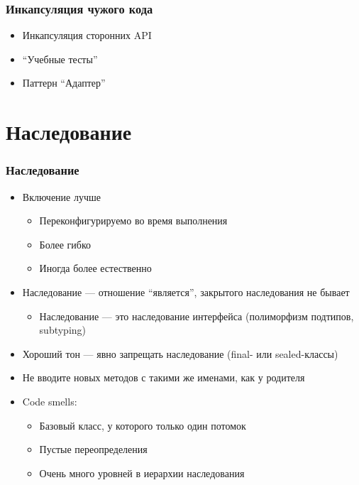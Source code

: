 \documentclass[xetex,mathserif,serif]{beamer}
\begin{document}
	\begin{frame}
		\frametitle{Инкапсуляция чужого кода}
		\begin{itemize}
			\item Инкапсуляция сторонних API
			\item ``Учебные тесты''
			\item Паттерн ``Адаптер''
		\end{itemize}
	\end{frame}

	\section{Наследование}

	\begin{frame}
		\frametitle{Наследование}
		\begin{itemize}
			\item Включение лучше
			\begin{itemize}
				\item Переконфигурируемо во время выполнения
				\item Более гибко
				\item Иногда более естественно
			\end{itemize}
			\item Наследование --- отношение ``является'', закрытого наследования не бывает
			\begin{itemize}
				\item Наследование --- это наследование интерфейса (полиморфизм подтипов, subtyping)
			\end{itemize}
			\item Хороший тон --- явно запрещать наследование (final- или sealed-классы)
			\item Не вводите новых методов с такими же именами, как у родителя
			\item Code smells:
			\begin{itemize}
				\item Базовый класс, у которого только один потомок
				\item Пустые переопределения
				\item Очень много уровней в иерархии наследования
			\end{itemize}
		\end{itemize}
	\end{frame}
\end{document}
